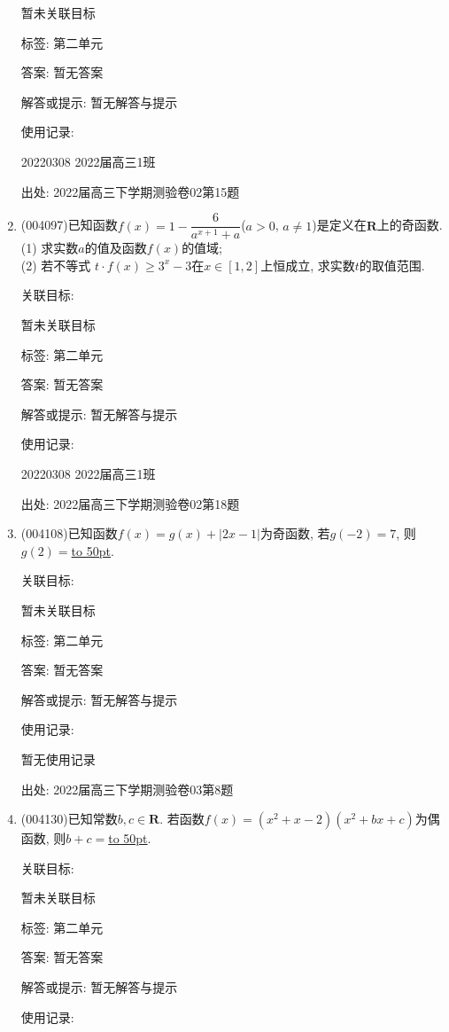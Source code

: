 \documentclass[10pt,a4paper]{article}
\newcommand{\blank}[1]{\underline{\hbox to #1pt{}}}
\begin{document}
\begin{enumerate}[1.]
暂未关联目标



标签: 第二单元

答案: 暂无答案

解答或提示: 暂无解答与提示

使用记录:

20220308	2022届高三1班	


出处: 2022届高三下学期测验卷02第15题
\item { (004097)}已知函数$f(x)=1-\dfrac 6{a^{x+1}+a}$($a>0$, $a\ne 1$)是定义在$\mathbf{R}$上的奇函数.\\
(1) 求实数$a$的值及函数$f(x)$的值域;\\
(2) 若不等式 $t\cdot f(x)\ge 3^x-3$在$x\in [1,2]$上恒成立, 求实数$t$的取值范围.


关联目标:

暂未关联目标



标签: 第二单元

答案: 暂无答案

解答或提示: 暂无解答与提示

使用记录:

20220308	2022届高三1班		


出处: 2022届高三下学期测验卷02第18题
\item { (004108)}已知函数$f(x)=g(x)+|2x-1|$为奇函数, 若$g(-2)=7$, 则$g(2)=$\blank{50}.


关联目标:

暂未关联目标



标签: 第二单元

答案: 暂无答案

解答或提示: 暂无解答与提示

使用记录:

暂无使用记录


出处: 2022届高三下学期测验卷03第8题
\item { (004130)}已知常数$b,c\in \mathbf{R}$. 若函数$f(x)=(x^2+x-2)(x^2+bx+c)$为偶函数, 则$b+c=$\blank{50}.


关联目标:

暂未关联目标



标签: 第二单元

答案: 暂无答案

解答或提示: 暂无解答与提示

使用记录:


\end{enumerate}
\end{document}
